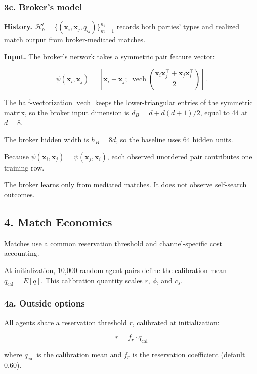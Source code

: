 \documentclass[11pt]{article}
\begin{document}
\subsubsection{3c. Broker's model}\label{c.-brokers-model}

\textbf{History.} \(\mathcal{H}_b^t = \{(\mathbf{x}_i, \mathbf{x}_j, q_{ij})\}_{m=1}^{n_b}\) records both parties' types and realized match output from broker-mediated matches.

\textbf{Input.} The broker's network takes a symmetric pair feature vector:

\[
\psi(\mathbf{x}_i,\mathbf{x}_j)
= \left[
\mathbf{x}_i+\mathbf{x}_j;\;
\operatorname{vech}\!\left(\frac{\mathbf{x}_i\mathbf{x}_j^\top+\mathbf{x}_j\mathbf{x}_i^\top}{2}\right)
\right].
\]

The half-vectorization \(\operatorname{vech}\) keeps the lower-triangular entries of the symmetric matrix, so the broker input dimension is \(d_B = d + d(d+1)/2\), equal to 44 at \(d = 8\).

The broker hidden width is \(h_B = 8d\), so the baseline uses 64 hidden units.

Because \(\psi(\mathbf{x}_i,\mathbf{x}_j)=\psi(\mathbf{x}_j,\mathbf{x}_i)\), each observed unordered pair contributes one training row.

The broker learns only from mediated matches. It does not observe self-search outcomes.

\subsection{4. Match Economics}\label{match-economics}

Matches use a common reservation threshold and channel-specific cost accounting.

At initialization, 10,000 random agent pairs define the calibration mean \(\bar{q}_{\text{cal}} = E[q]\). This calibration quantity scales \(r\), \(\phi\), and \(c_s\).

\subsubsection{4a. Outside options}\label{a.-outside-options}

All agents share a reservation threshold \(r\), calibrated at initialization:

\[r = f_r \cdot \bar{q}_{\text{cal}}\]

where \(\bar{q}_{\text{cal}}\) is the calibration mean and \(f_r\) is the reservation coefficient (default 0.60).
\end{document}
